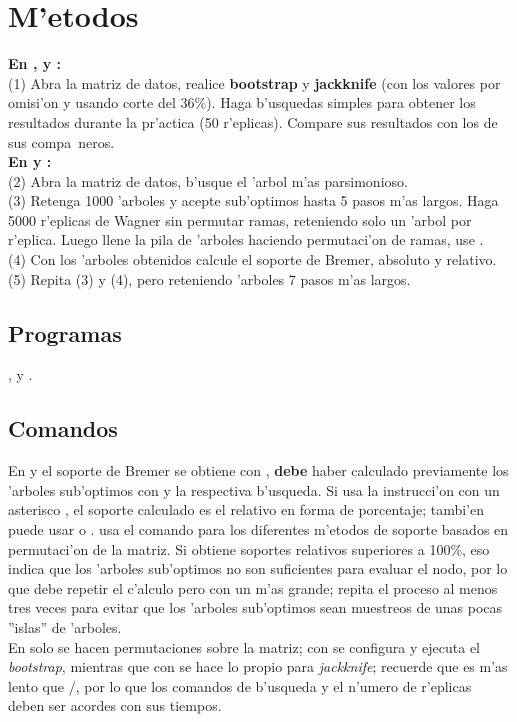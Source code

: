 \section{M'etodos}
\noindent
\textbf{En ,  y :}\\
(1) Abra la matriz de datos, realice \textbf{bootstrap} y \textbf{jackknife} (con los valores por omisi'on y usando corte del 36\%). Haga b'usquedas simples para obtener los resultados durante la pr'actica (50 r'eplicas). Compare sus resultados con los de sus compa~neros.\\
\textbf{En  y :}\\
(2) Abra la matriz de datos, b'usque el 'arbol m'as parsimonioso.\\
(3) Retenga 1000 'arboles y acepte sub'optimos hasta  5 pasos m'as largos. Haga 5000 r'eplicas de Wagner sin permutar ramas, reteniendo solo un 'arbol por r'eplica. Luego llene la pila de 'arboles haciendo permutaci'on de ramas, use .\\
(4) Con los 'arboles obtenidos calcule el soporte de Bremer, absoluto y relativo.\\
(5) Repita (3) y (4), pero reteniendo 'arboles 7 pasos m'as largos.
\subsection{Programas}
\noindent
{},  y .
\subsection{Comandos}
En  y  el soporte de Bremer se obtiene con , \textbf{debe} haber calculado previamente los 'arboles  sub'optimos con  y la respectiva b'usqueda. Si usa la instrucci'on con un asterisco , el soporte calculado es el relativo en forma de porcentaje; tambi'en puede usar \Cmd{bsupport [;} o \Cmd{bsupport ];}.  usa el comando  para los diferentes m'etodos de soporte basados en permutaci'on de la matriz. Si obtiene soportes relativos superiores a 100\%, eso indica que los 'arboles sub'optimos no son suficientes para evaluar el nodo, por lo que debe repetir el c'alculo pero con un  m'as grande; repita el proceso al menos tres veces para evitar que los 'arboles sub'optimos sean muestreos de unas pocas ''islas'' de 'arboles.\\
En  solo se hacen permutaciones sobre la matriz; con  se configura y ejecuta el \textit{bootstrap}, mientras que con   se hace lo propio para \textit{jackknife}; recuerde que  es m'as lento que /, por lo que los comandos de b'usqueda y el n'umero de r'eplicas deben ser acordes con sus tiempos.

